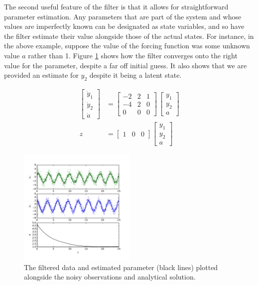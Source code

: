 \documentclass[12pt,oneside]{amsart}
\begin{document}
The second useful feature of the filter is that it allows for straightforward parameter estimation. Any parameters that are part of the system and whose values are imperfectly known can be designated as state variables, and so have the filter estimate their value alongside those of the actual states. For instance, in the above example, suppose the value of the forcing function was some unknown value $a$ rather than 1. Figure \ref{fig:RTS_Pest} shows how the filter converges onto the right value for the parameter, despite a far off initial guess. It also shows that we are provided an estimate for $y_2$ despite it being a latent state. 

\begin{align}
\begin{bmatrix}
\dot y_1 \\
\dot y_2 \\
\dot a
\end{bmatrix}
&= 
\begin{bmatrix}
-2 & 2 & 1 \\
-4 & 2 & 0 \\
0  & 0 & 0 
\end{bmatrix}
\,
\begin{bmatrix}
y_1 \\
y_2 \\
a
\end{bmatrix}
\\
z &= \begin{bmatrix}
1 & 0 & 0
\end{bmatrix}
\begin{bmatrix}
y_1 \\
y_2 \\
a
\end{bmatrix}
%
\end{align}



\begin{figure}[htbp]
\begin{center}
\includegraphics[width = 0.5\textwidth]{Figures/RTS_Pest}
\caption{The filtered data and estimated parameter (black lines) plotted alongside the noisy observations and analytical solution. %
}
\label{fig:RTS_Pest}
\end{center}
\end{figure}
\end{document}
